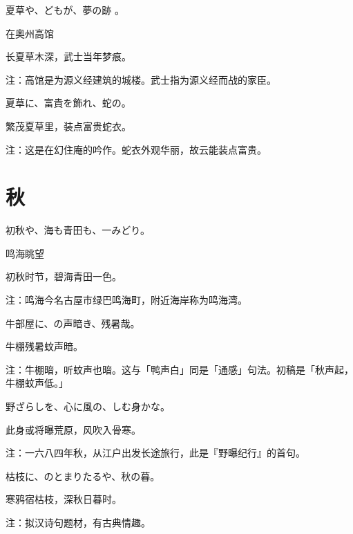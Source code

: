 \begin{haiku}
    {\FH 夏草や、どもが、夢の跡 。}

    {\FK 在奥州高馆}

    {\FK 长夏草木深，武士当年梦痕。}

    {\FT 注：高馆是为源义经建筑的城楼。武士指为源义经而战的家臣。}
\end{haiku}

\begin{haiku}
    {\FH 夏草に、富貴を飾れ、蛇の。}

    {\FK 繁茂夏草里，装点富贵蛇衣。}

    {\FT 注：这是在幻住庵的吟作。蛇衣外观华丽，故云能装点富贵。}
\end{haiku}

\section{\FK 秋}

\setcounter{haikucounter}{0}

\begin{haiku}
    {\FH 初秋や、海も青田も、一みどり。}

    {\FK 鸣海眺望}

    {\FK 初秋时节，碧海青田一色。}

    {\FT 注：鸣海今名古屋市绿巴鸣海町，附近海岸称为鸣海湾。}
\end{haiku}

\begin{haiku}
    {\FH 牛部屋に、の声暗き、残暑哉。}

    {\FK 牛棚残暑蚊声暗。}

    {\FT 注：牛棚暗，听蚊声也暗。这与「鸭声白」同是「通感」句法。初稿是「秋声起，牛棚蚊声低。」}
\end{haiku}

\begin{haiku}
    {\FH 野ざらしを、心に風の、しむ身かな。}

    {\FK 此身或将曝荒原，风吹入骨寒。}

    {\FT 注：一六八四年秋，从江户出发长途旅行，此是『野曝纪行』的首句。}
\end{haiku}

\begin{haiku}
    {\FH 枯枝に、のとまりたるや、秋の暮。}

    {\FK 寒鸦宿枯枝，深秋日暮时。}

    {\FT 注：拟汉诗句题材，有古典情趣。}
\end{haiku}

